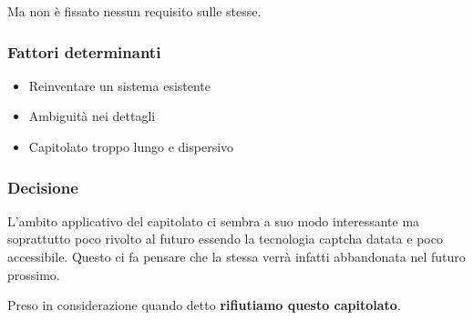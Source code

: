Ma non è fissato nessun requisito sulle stesse.

\subsubsection{Fattori determinanti}
\begin{itemize}
    \item Reinventare un sistema esistente
    \item Ambiguità nei dettagli
    \item Capitolato troppo lungo e dispersivo
\end{itemize}

\subsubsection{Decisione}
L'ambito applicativo del capitolato ci sembra a suo modo interessante ma soprattutto poco rivolto al futuro essendo la tecnologia captcha datata e poco accessibile. Questo ci fa pensare che la stessa verrà infatti abbandonata nel futuro prossimo.

Preso in considerazione quando detto \textbf{rifiutiamo questo capitolato}.
